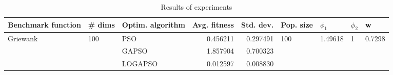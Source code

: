 \begin{table}
\centering
\caption{Results of experiments}
\begin{tabular}{lllrrllll}
\toprule
       Benchmark function &              \# dims & Optim. algorithm &  Avg. fitness &  Std. dev. &            Pop. size &               $\phi_{1}$ &         $\phi_{2}$ &                       w \\
\midrule
\multirow{3}{*}{Griewank} & \multirow{3}{*}{100} &              PSO &      0.456211 &   0.297491 & \multirow{3}{*}{100} & \multirow{3}{*}{1.49618} & \multirow{3}{*}{1} & \multirow{3}{*}{0.7298} \\
                          &                      &            GAPSO &      1.857904 &   0.700323 &                      &                          &                    &                         \\
                          &                      &          LOGAPSO &      0.012597 &   0.008830 &                      &                          &                    &                         \\
\bottomrule
\end{tabular}
\end{table}
